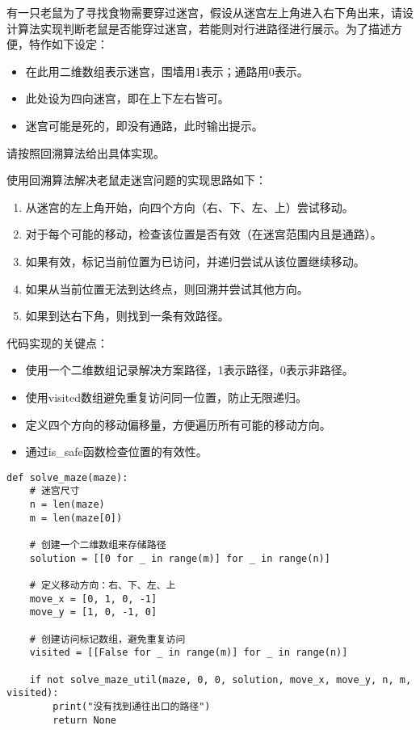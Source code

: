 \documentclass[12pt,twoside]{article}
\begin{document}
\begin{problems}
\problem 有一只老鼠为了寻找食物需要穿过迷宫，假设从迷宫左上角进入右下角出来，请设计算法实现判断老鼠是否能穿过迷宫，若能则对行进路径进行展示。为了描述方便，特作如下设定：
\begin{itemize}
   \item 在此用二维数组表示迷宫，围墙用1表示；通路用0表示。
   \item 此处设为四向迷宫，即在上下左右皆可。
   \item 迷宫可能是死的，即没有通路，此时输出提示。
\end{itemize}
\bparts
\ppart 请按照回溯算法给出具体实现。

使用回溯算法解决老鼠走迷宫问题的实现思路如下：

\begin{enumerate}
    \item 从迷宫的左上角开始，向四个方向（右、下、左、上）尝试移动。
    \item 对于每个可能的移动，检查该位置是否有效（在迷宫范围内且是通路）。
    \item 如果有效，标记当前位置为已访问，并递归尝试从该位置继续移动。
    \item 如果从当前位置无法到达终点，则回溯并尝试其他方向。
    \item 如果到达右下角，则找到一条有效路径。
\end{enumerate}

代码实现的关键点：
\begin{itemize}
    \item 使用一个二维数组记录解决方案路径，1表示路径，0表示非路径。
    \item 使用visited数组避免重复访问同一位置，防止无限递归。
    \item 定义四个方向的移动偏移量，方便遍历所有可能的移动方向。
    \item 通过is\_safe函数检查位置的有效性。
\end{itemize}
\begin{verbatim}
def solve_maze(maze):
    # 迷宫尺寸
    n = len(maze)
    m = len(maze[0])
    
    # 创建一个二维数组来存储路径
    solution = [[0 for _ in range(m)] for _ in range(n)]
    
    # 定义移动方向：右、下、左、上
    move_x = [0, 1, 0, -1]
    move_y = [1, 0, -1, 0]
    
    # 创建访问标记数组，避免重复访问
    visited = [[False for _ in range(m)] for _ in range(n)]
    
    if not solve_maze_util(maze, 0, 0, solution, move_x, move_y, n, m, visited):
        print("没有找到通往出口的路径")
        return None
    

\end{verbatim}
\end{problems}
\end{document}
